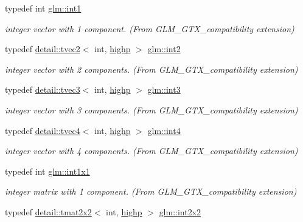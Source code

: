 \begin{DoxyCompactItemize}
typedef int \hyperlink{group__gtx__compatibility_gaba41d7803e4b24c17656d74377b88286}{glm\+::int1}
\begin{DoxyCompactList}\small\item\em integer vector with 1 component. (From G\+L\+M\+\_\+\+G\+T\+X\+\_\+compatibility extension) \end{DoxyCompactList}\item 
typedef \hyperlink{structglm_1_1detail_1_1tvec2}{detail\+::tvec2}$<$ int, \hyperlink{namespaceglm_a0f04f086094c747d227af4425893f545ac6f7eab42eacbb10d59a58e95e362074}{highp} $>$ \hyperlink{group__gtx__compatibility_ga3f999377257cbda84c745b688ddcba81}{glm\+::int2}
\begin{DoxyCompactList}\small\item\em integer vector with 2 components. (From G\+L\+M\+\_\+\+G\+T\+X\+\_\+compatibility extension) \end{DoxyCompactList}\item 
typedef \hyperlink{structglm_1_1detail_1_1tvec3}{detail\+::tvec3}$<$ int, \hyperlink{namespaceglm_a0f04f086094c747d227af4425893f545ac6f7eab42eacbb10d59a58e95e362074}{highp} $>$ \hyperlink{group__gtx__compatibility_gac305b0da08fad90d91854569679c935e}{glm\+::int3}
\begin{DoxyCompactList}\small\item\em integer vector with 3 components. (From G\+L\+M\+\_\+\+G\+T\+X\+\_\+compatibility extension) \end{DoxyCompactList}\item 
typedef \hyperlink{structglm_1_1detail_1_1tvec4}{detail\+::tvec4}$<$ int, \hyperlink{namespaceglm_a0f04f086094c747d227af4425893f545ac6f7eab42eacbb10d59a58e95e362074}{highp} $>$ \hyperlink{group__gtx__compatibility_ga9f621a690aa1c2918a9a8a684376b562}{glm\+::int4}
\begin{DoxyCompactList}\small\item\em integer vector with 4 components. (From G\+L\+M\+\_\+\+G\+T\+X\+\_\+compatibility extension) \end{DoxyCompactList}\item 
typedef int \hyperlink{group__gtx__compatibility_ga09016a637a3cd093c22e6188080ac750}{glm\+::int1x1}
\begin{DoxyCompactList}\small\item\em integer matrix with 1 component. (From G\+L\+M\+\_\+\+G\+T\+X\+\_\+compatibility extension) \end{DoxyCompactList}\item 
typedef \hyperlink{structglm_1_1detail_1_1tmat2x2}{detail\+::tmat2x2}$<$ int, \hyperlink{namespaceglm_a0f04f086094c747d227af4425893f545ac6f7eab42eacbb10d59a58e95e362074}{highp} $>$ \hyperlink{group__gtx__compatibility_ga7762d2b809aab75003e7e7873ca74a2f}{glm\+::int2x2}

\end{DoxyCompactItemize}
